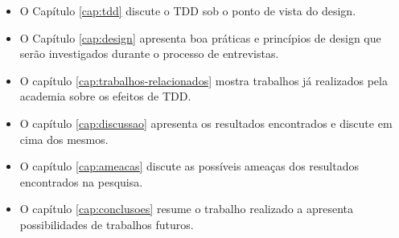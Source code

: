 \begin{itemize}
	\item O Capítulo \ref{cap:tdd} discute o TDD sob o ponto de vista do design.
  
	\item O Capítulo \ref{cap:design} apresenta boa práticas e princípios de design
	que serão investigados durante o processo de entrevistas.

	\item O capítulo \ref{cap:trabalhos-relacionados} mostra trabalhos já
	realizados pela academia sobre os efeitos de TDD.
	
	\item O capítulo \ref{cap:discussao} apresenta os resultados encontrados e
	discute em cima dos mesmos.
	
	\item O capítulo \ref{cap:ameacas} discute as possíveis ameaças dos resultados
	encontrados na pesquisa.
	
	\item O capítulo \ref{cap:conclusoes} resume o trabalho realizado a apresenta
	possibilidades de trabalhos futuros.
\end{itemize}
